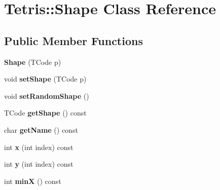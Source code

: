 \hypertarget{class_tetris_1_1_shape}{\section{Tetris\-:\-:Shape Class Reference}
\label{class_tetris_1_1_shape}
}
\subsection*{Public Member Functions}
\begin{DoxyCompactItemize}
\item 
\hypertarget{class_tetris_1_1_shape_ab85bdb3dde6cbbb1285d1ac1aba6c703}{{\bfseries Shape} (T\-Code p)}\label{class_tetris_1_1_shape_ab85bdb3dde6cbbb1285d1ac1aba6c703}

\item 
\hypertarget{class_tetris_1_1_shape_ac5b889fb9ef82dbd5ab3f7cb7b1dfa6b}{void {\bfseries set\-Shape} (T\-Code p)}\label{class_tetris_1_1_shape_ac5b889fb9ef82dbd5ab3f7cb7b1dfa6b}

\item 
\hypertarget{class_tetris_1_1_shape_aa9ad475137695560851d5870c30ac908}{void {\bfseries set\-Random\-Shape} ()}\label{class_tetris_1_1_shape_aa9ad475137695560851d5870c30ac908}

\item 
\hypertarget{class_tetris_1_1_shape_ae02ede9ddc9bb984ad9a66e662a8c552}{T\-Code {\bfseries get\-Shape} () const }\label{class_tetris_1_1_shape_ae02ede9ddc9bb984ad9a66e662a8c552}

\item 
\hypertarget{class_tetris_1_1_shape_ad88cabd968f4726a8000078c25a5d94f}{char {\bfseries get\-Name} () const }\label{class_tetris_1_1_shape_ad88cabd968f4726a8000078c25a5d94f}

\item 
\hypertarget{class_tetris_1_1_shape_ad3553d75158dfee272012721c9b31c1a}{int {\bfseries x} (int index) const }\label{class_tetris_1_1_shape_ad3553d75158dfee272012721c9b31c1a}

\item 
\hypertarget{class_tetris_1_1_shape_aec2eec106dc13cb887d8e589d12648ab}{int {\bfseries y} (int index) const }\label{class_tetris_1_1_shape_aec2eec106dc13cb887d8e589d12648ab}

\item 
\hypertarget{class_tetris_1_1_shape_a916d65e92ad9bbca5257eed86446efc4}{int {\bfseries min\-X} () const }\label{class_tetris_1_1_shape_a916d65e92ad9bbca5257eed86446efc4}


\end{DoxyCompactItemize}
